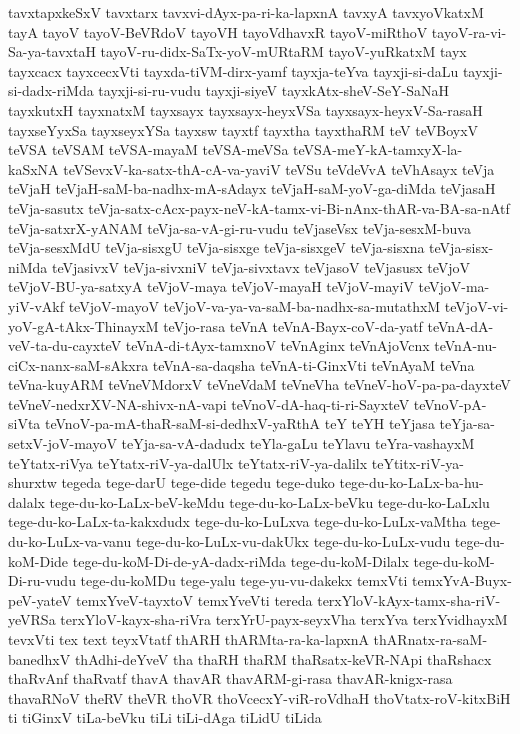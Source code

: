 {tavxtapxkeSxV
tavxtarx
tavxvi-dAyx-pa-ri-ka-lapxnA
tavxyA
tavxyoVkatxM
tayA
tayoV
tayoV-BeVRdoV
tayoVH
tayoVdhavxR
tayoV-miRthoV
tayoV-ra-vi-Sa-ya-tavxtaH
tayoV-ru-didx-SaTx-yoV-mURtaRM
tayoV-yuRkatxM
tayx
tayxcacx
tayxcecxVti
tayxda-tiVM-dirx-yamf
tayxja-teYva
tayxji-si-daLu
tayxji-si-dadx-riMda
tayxji-si-ru-vudu
tayxji-siyeV
tayxkAtx-sheV-SeY-SaNaH
tayxkutxH
tayxnatxM
tayxsayx
tayxsayx-heyxVSa
tayxsayx-heyxV-Sa-rasaH
tayxseYyxSa
tayxseyxYSa
tayxsw
tayxtf
tayxtha
tayxthaRM
teV
teVBoyxV
teVSA
teVSAM
teVSA-mayaM
teVSA-meVSa
teVSA-meY-kA-tamxyX-la-kaSxNA
teVSevxV-ka-satx-thA-cA-va-yaviV
teVSu
teVdeVvA
teVhAsayx
teVja
teVjaH
teVjaH-saM-ba-nadhx-mA-sAdayx
teVjaH-saM-yoV-ga-diMda
teVjasaH
teVja-sasutx
teVja-satx-cAcx-payx-neV-kA-tamx-vi-Bi-nAnx-thAR-va-BA-sa-nAtf
teVja-satxrX-yANAM
teVja-sa-vA-gi-ru-vudu
teVjaseVsx
teVja-sesxM-buva
teVja-sesxMdU
teVja-sisxgU
teVja-sisxge
teVja-sisxgeV
teVja-sisxna
teVja-sisx-niMda
teVjasivxV
teVja-sivxniV
teVja-sivxtavx
teVjasoV
teVjasusx
teVjoV
teVjoV-BU-ya-satxyA
teVjoV-maya
teVjoV-mayaH
teVjoV-mayiV
teVjoV-ma-yiV-vAkf
teVjoV-mayoV
teVjoV-va-ya-va-saM-ba-nadhx-sa-mutathxM
teVjoV-vi-yoV-gA-tAkx-ThinayxM
teVjo-rasa
teVnA
teVnA-Bayx-coV-da-yatf
teVnA-dA-veV-ta-du-cayxteV
teVnA-di-tAyx-tamxnoV
teVnAginx
teVnAjoVcnx
teVnA-nu-ciCx-nanx-saM-sAkxra
teVnA-sa-daqsha
teVnA-ti-GinxVti
teVnAyaM
teVna
teVna-kuyARM
teVneVMdorxV
teVneVdaM
teVneVha
teVneV-hoV-pa-pa-dayxteV
teVneV-nedxrXV-NA-shivx-nA-vapi
teVnoV-dA-haq-ti-ri-SayxteV
teVnoV-pA-siVta
teVnoV-pa-mA-thaR-saM-si-dedhxV-yaRthA
teY
teYH
teYjasa
teYja-sa-setxV-joV-mayoV
teYja-sa-vA-dadudx
teYla-gaLu
teYlavu
teYra-vashayxM
teYtatx-riVya
teYtatx-riV-ya-dalUlx
teYtatx-riV-ya-dalilx
teYtitx-riV-ya-shurxtw
tegeda
tege-darU
tege-dide
tegedu
tege-duko
tege-du-ko-LaLx-ba-hu-dalalx
tege-du-ko-LaLx-beV-keMdu
tege-du-ko-LaLx-beVku
tege-du-ko-LaLxlu
tege-du-ko-LaLx-ta-kakxdudx
tege-du-ko-LuLxva
tege-du-ko-LuLx-vaMtha
tege-du-ko-LuLx-va-vanu
tege-du-ko-LuLx-vu-dakUkx
tege-du-ko-LuLx-vudu
tege-du-koM-Dide
tege-du-koM-Di-de-yA-dadx-riMda
tege-du-koM-Dilalx
tege-du-koM-Di-ru-vudu
tege-du-koMDu
tege-yalu
tege-yu-vu-dakekx
temxVti
temxYvA-Buyx-peV-yateV
temxYveV-tayxtoV
temxYveVti
tereda
terxYloV-kAyx-tamx-sha-riV-yeVRSa
terxYloV-kayx-sha-riVra
terxYrU-payx-seyxVha
terxYva
terxYvidhayxM
tevxVti
tex
text
teyxVtatf
thARH
thARMta-ra-ka-lapxnA
thARnatx-ra-saM-banedhxV
thAdhi-deYveV
tha
thaRH
thaRM
thaRsatx-keVR-NApi
thaRshacx
thaRvAnf
thaRvatf
thavA
thavAR
thavARM-gi-rasa
thavAR-knigx-rasa
thavaRNoV
theRV
theVR
thoVR
thoVcecxY-viR-roVdhaH
thoVtatx-roV-kitxBiH
ti
tiGinxV
tiLa-beVku
tiLi
tiLi-dAga
tiLidU
tiLida
}
